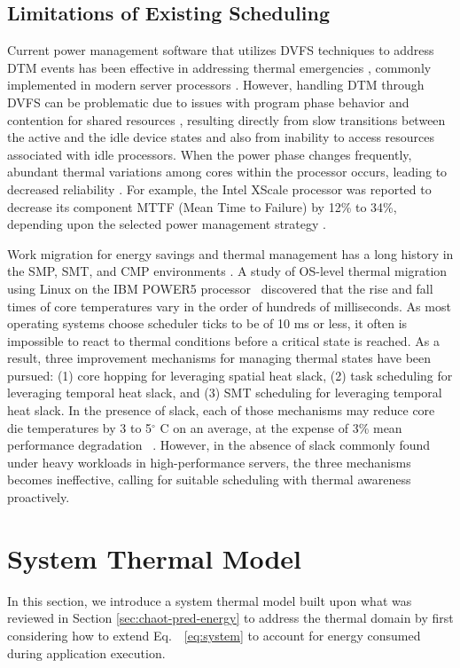 \documentclass[times, 10pt,twocolumn]{IEEEtran}
\newcommand{\equationname}{Eq.\ }
\begin{document}
\subsection{Limitations of Existing Scheduling}
\label{sec:shortc-comp-workl}
Current power management software that utilizes DVFS techniques to
address DTM events has been effective in addressing thermal emergencies
\cite{Donald2006,Hanson2007}, commonly implemented in modern server
processors \cite{AMD2007,Intel2009}.  However, handling DTM through DVFS
can be problematic due to issues with program phase behavior and
contention for shared resources \cite{Wircher2008,Coskun2008d},
resulting directly from slow transitions between the active and the idle
device states and also from inability to access resources associated
with idle processors.  When the power phase changes frequently, abundant
thermal variations among cores within the processor occurs, leading to
decreased reliability \cite{Rosing2007,Coskun2008d,Kursun2009}.  For
example, the Intel XScale processor was reported to decrease its
component MTTF (Mean Time to Failure) by 12\% to 34\%, depending upon
the selected power management strategy \cite{Rosing2007}.

Work migration for energy savings and thermal management has a long
history in the SMP, SMT, and CMP environments
\cite{Yao1995,Gomaa2004,Kumar2006,Yang2008}.  A study of OS-level
thermal migration using Linux on the IBM POWER5
processor~\cite{Choi2007} discovered that the rise and fall times of
core temperatures vary in the order of hundreds of milliseconds.  As
most operating systems choose scheduler ticks to be of 10 ms or less, it
often is impossible to react to thermal conditions before a critical
state is reached.  As a result, three improvement mechanisms for
managing thermal states have been pursued: (1) core hopping for
leveraging spatial heat slack, (2) task scheduling for leveraging
temporal heat slack, and (3) SMT scheduling for leveraging temporal heat
slack.  In the presence of slack, each of those mechanisms may reduce
core die temperatures by 3 to 5$^{\circ}$ C on an average, at the
expense of 3\% mean performance degradation ~\cite{Choi2007,Ayoub2009}.
However, in the absence of slack commonly found under heavy workloads in
high-performance servers, the three mechanisms becomes ineffective,
calling for suitable scheduling with thermal awareness proactively.

\section{System Thermal Model}
\label{sec:model}
In this section, we introduce a system thermal model built upon what was
reviewed in Section \ref{sec:chaot-pred-energy} to address the thermal
domain by first considering how to extend
\equationname~\eqref{eq:system} to account for energy consumed during 
application execution.
\end{document}
